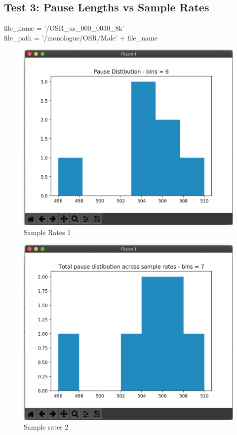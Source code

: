 \subsection{Test 3: Pause Lengths vs Sample Rates}


file\_name = '/OSR\_us\_000\_0030\_8k' \\

file\_path = '/monologue/OSR/Male' + file\_name

\begin{figure}[h]
	\center
	\includegraphics[scale=0.2]{src/main-matter/results/preliminary-testing/sample-rates/031}
	\caption{Sample Rates 1}
	\label{fig:031}
\end{figure}

\begin{figure}[h]
	\center
	\includegraphics[scale=0.2]{src/main-matter/results/preliminary-testing/sample-rates/032}
	\caption{Sample rates 2}
	\label{fig:032}
\end{figure}